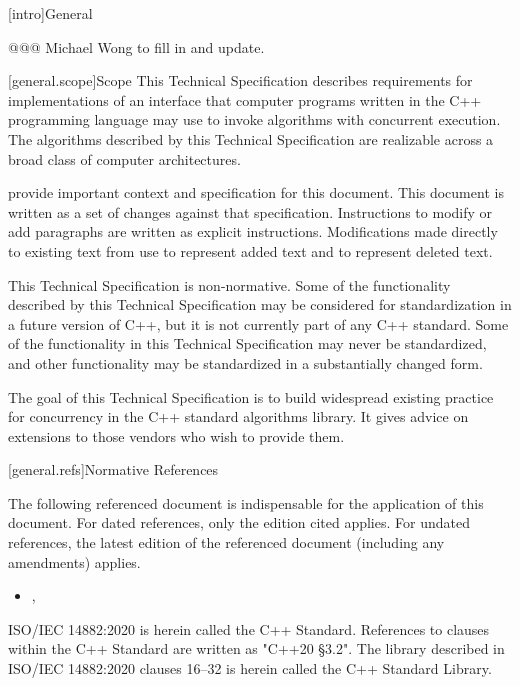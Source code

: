
[intro]{General}

@@@ Michael Wong to fill in and update.

[general.scope]{Scope}
\pnum
This Technical Specification describes requirements for implementations of an interface that computer programs written in the C++ programming language may use to invoke algorithms with concurrent execution. The algorithms described by this Technical Specification are realizable across a broad class of computer architectures.

\pnum
{\cppstddocno} provide important context and specification for
this document. This document is written as a set of changes against that specification.  Instructions to modify or add paragraphs are written as
explicit instructions.  Modifications made directly to existing text from {\cppstddocno} use  to represent added text and  to represent deleted text.

\pnum
This Technical Specification is non-normative. Some of the functionality described by this Technical Specification may be considered for standardization in a future version of C++, but it is not currently part of any C++ standard. Some of the functionality in this Technical Specification may never be standardized, and other functionality may be standardized in a substantially changed form.

\pnum
The goal of this Technical Specification is to build widespread existing practice for concurrency in the C++ standard algorithms library. It gives advice on extensions to those vendors who wish to provide them.

[general.refs]{Normative References}

\pnum
The following referenced document is indispensable for the application of this document. For dated references, only the edition cited applies. For undated references, the latest edition of the referenced document (including any amendments) applies.

\begin{itemize}
\item {\cppstddocno}, 
\end{itemize}

\pnum
ISO/IEC 14882:2020 is herein called the C++ Standard. References to clauses within the C++ Standard are written as "C++20 §3.2". The library described in ISO/IEC 14882:2020 clauses 16–32 is herein called the C++ Standard Library.


